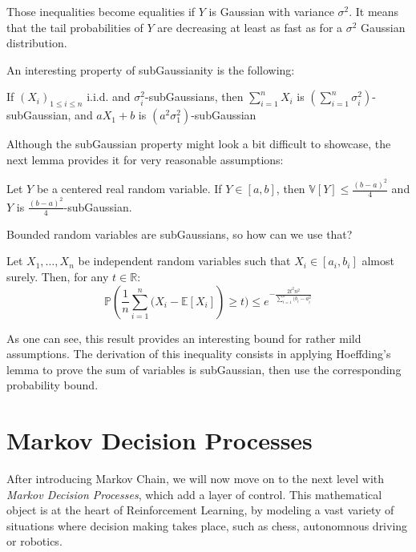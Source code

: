 Those inequalities become equalities if $Y$ is Gaussian with variance $\sigma^2$. It means that the tail probabilities of $Y$ are decreasing at least as fast as for a $\sigma^2$ Gaussian distribution.

An interesting property of subGaussianity is the following:
\begin{thm}
  If $(X_i)_{1 \leq i \leq n}$ i.i.d. and $\sigma_i^2$-subGaussians, then $\sum_{i=1}^n X_i$ is $(\sum_{i=1}^n \sigma_i^2)$-subGaussian, and $aX_1 + b$ is $(a^2\sigma_1^2)$-subGaussian
\end{thm}

Although the subGaussian property might look a bit difficult to showcase, the next lemma provides it for very reasonable assumptions:

\begin{lem}
  Let $Y$ be a centered real random variable. If $Y \in [a, b]$, then $\mathbb{V}[Y] \leq \frac{(b - a)^2}{4}$ and $Y$ is $\frac{(b-a)^2}{4}$-subGaussian.
\end{lem}

Bounded random variables are subGaussians, so how can we use that?

\begin{thm}\label{thm:hoeffding}
  Let $X_1, \dots, X_n$ be independent random variables such that $X_i \in [a_i, b_i]$ almost surely. Then, for any $t \in \mathbb{R}$:
  $$\mathbb{P}\left(\frac{1}{n} \sum_{i=1}^n (X_i - \mathbb{E}[X_i]\right) \geq t) \leq e^{-\frac{2 t^2 n^2}{\sum_{i=1}^n (b_i - a_i^2}}$$
\end{thm}

As one can see, this result provides an interesting bound for rather mild assumptions. The derivation of this inequality consists in applying Hoeffding's lemma to prove the sum of variables is subGaussian, then use the corresponding probability bound.

\section{Markov Decision Processes}
\label{section:MDP}

After introducing Markov Chain, we will now move on to the next level with \emph{Markov Decision Processes}, which add a layer of control. This mathematical object is at the heart of Reinforcement Learning, by modeling a vast variety of situations where decision making takes place, such as chess, autonomnous driving or robotics.

